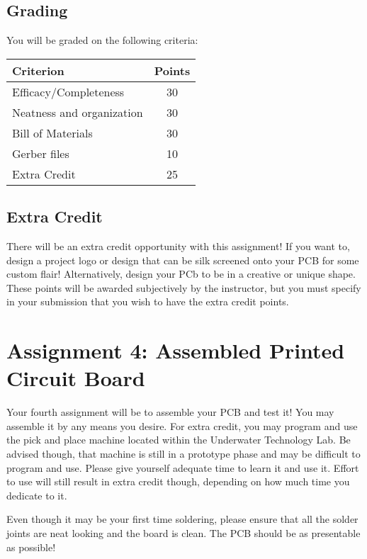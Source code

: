     \subsection*{Grading}
    You will be graded on the following criteria:

    \begin{table}[h!]
        \begin{tabular}{l | c}
            \toprule
            Criterion & Points \\

            \midrule
            Efficacy/Completeness & 30 \\
            Neatness and organization & 30 \\
            Bill of Materials & 30 \\
            Gerber files & 10 \\
            Extra Credit & 25 \\
            \bottomrule
        \end{tabular}
    \end{table}
    
    \subsection*{Extra Credit}
    There will be an extra credit opportunity with this assignment!
    If you want to, design a project logo or design that can be silk screened onto your PCB for some custom flair!
    Alternatively, design your PCb to be in a creative or unique shape.
    These points will be awarded subjectively by the instructor, but you must specify in your submission that you wish to have the extra credit points.

\section*{Assignment 4: Assembled Printed Circuit Board}
Your fourth assignment will be to assemble your PCB and test it!
You may assemble it by any means you desire.
For extra credit, you may program and use the pick and place machine located within the Underwater Technology Lab.
Be advised though, that machine is still in a prototype phase and may be difficult to program and use.
Please give yourself adequate time to learn it and use it.
Effort to use will still result in extra credit though, depending on how much time you dedicate to it.

Even though it may be your first time soldering, please ensure that all the solder joints are neat looking and the board is clean.
The PCB should be as presentable as possible!

